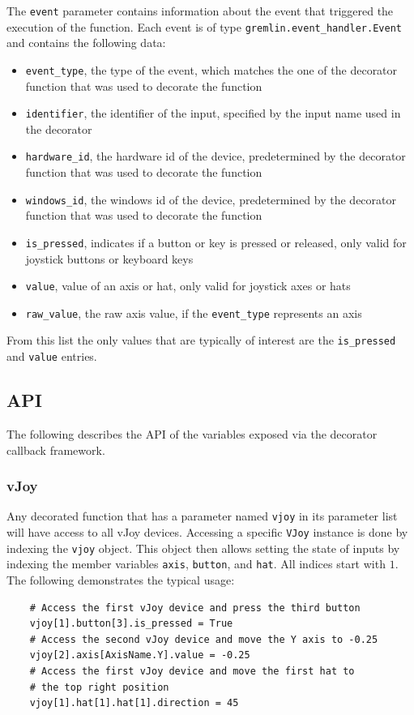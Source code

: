 \documentclass[a4, 10pt]{article}
\begin{document}
The \verb+event+ parameter contains information about the event that
triggered the execution of the function. Each event is of type
\verb+gremlin.event_handler.Event+ and contains the following data:

\begin{itemize}
    \item \verb+event_type+, the type of the event, which matches the
        one of the decorator function that was used to decorate the
        function
    \item \verb+identifier+, the identifier of the input, specified by the
        input name used in the decorator
    \item \verb+hardware_id+, the hardware id of the device, predetermined by the
        decorator function that was used to decorate the function
    \item \verb+windows_id+, the windows id of the device, predetermined by the
        decorator function that was used to decorate the function
    \item \verb+is_pressed+, indicates if a button or key is pressed or
        released, only valid for joystick buttons or keyboard keys
    \item \verb+value+, value of an axis or hat, only valid for joystick axes
        or hats
    \item \verb+raw_value+, the raw axis value, if the \verb+event_type+
        represents an axis
\end{itemize}

From this list the only values that are typically of interest are the
\verb+is_pressed+ and \verb+value+ entries.


\subsection{API}
\label{sec:cm_api}

The following describes the API of the variables exposed via the
decorator callback framework.


\subsubsection{vJoy}

Any decorated function that has a parameter named \verb+vjoy+ in its
parameter list will have access to all vJoy devices.  Accessing a
specific \verb+VJoy+ instance is done by indexing the \verb+vjoy+
object. This object then allows setting the state of inputs by indexing
the member variables \verb+axis+, \verb+button+, and \verb+hat+.
All indices start with $1$. The following demonstrates the typical
usage:
\begin{verbatim}
    # Access the first vJoy device and press the third button
    vjoy[1].button[3].is_pressed = True
    # Access the second vJoy device and move the Y axis to -0.25
    vjoy[2].axis[AxisName.Y].value = -0.25
    # Access the first vJoy device and move the first hat to
    # the top right position
    vjoy[1].hat[1].hat[1].direction = 45
\end{verbatim}
\end{document}
